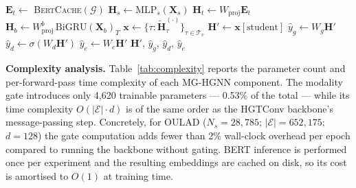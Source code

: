 \documentclass[sigconf,review]{acmart}
\begin{document}
\begin{algorithm}[t]
\DontPrintSemicolon
\caption{MG-HGNN Forward Pass}
\label{alg:forward}
$\mathbf{E}_t \leftarrow$
  \textsc{BertCache}$(\mathcal{G})$
  \;
$\mathbf{H}_s \leftarrow \text{MLP}_s(\mathbf{X}_s)$
  \;
$\mathbf{H}_t \leftarrow
  W_{\text{proj}} \mathbf{E}_t$
  \;
$\mathbf{H}_b \leftarrow
  W_{\text{proj}}^b\,\text{BiGRU}(\mathbf{X}_b)_T$
  \;
\BlankLine
{}
\BlankLine
{}
$\mathbf{x} \leftarrow
  \{\tau : \tilde{\mathbf{H}}^{(\cdot)}_\tau\}
  _{\tau \in \mathcal{T}_v}$\;
$\mathbf{H}' \leftarrow \mathbf{x}[\text{student}]$\;
\BlankLine
{}
$\hat{y}_g \leftarrow W_g \mathbf{H}'$\;
$\hat{y}_d \leftarrow \sigma(W_d \mathbf{H}')$\;
$\hat{y}_e \leftarrow W_e \mathbf{H}'$\;
\Return $\mathbf{H}',\,\hat{y}_g,\,\hat{y}_d,\,
  \hat{y}_e$\;
\end{algorithm}

\textbf{Complexity analysis.}
Table~\ref{tab:complexity} reports the parameter
count and per-forward-pass time complexity of each
MG-HGNN component. The modality gate introduces
only 4,620 trainable parameters --- 0.53\% of the
total --- while its time complexity $O(|\mathcal{E}|
\cdot d)$ is of the same order as the HGTConv
backbone's message-passing step. Concretely, for
OULAD ($N_s {=} 28{,}785$; $|\mathcal{E}|
{=} 652{,}175$; $d {=} 128$) the gate computation
adds fewer than 2\% wall-clock overhead per epoch
compared to running the backbone without gating.
BERT inference is performed once per experiment and
the resulting embeddings are cached on disk, so its
cost is amortised to $O(1)$ at training time.
\end{document}
